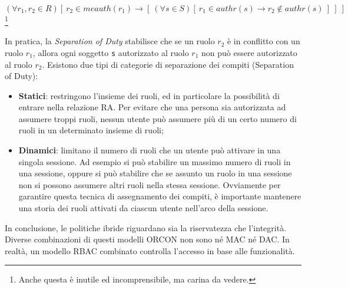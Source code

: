 \[
      (\forall r_1, r_2 \in R) [ \ r_2 \in meauth(r_1) \rightarrow
                  [ \ (\forall s \in S) [ \ r_1 \in authr(s) \rightarrow r_2 \notin authr(s) \ ] \ ] \ ]
\] \footnote{Anche questa è inutile ed incomprensibile, ma carina da vedere.}

In pratica, la \textit{Separation of Duty} stabilisce che
se un ruolo \(r_2\) è in conflitto con un ruolo \(r_1\),
allora ogni soggetto \verb|s| autorizzato al ruolo \(r_1\)
non può essere autorizzato al ruolo \(r_2\).
Esistono due tipi di categorie di separazione dei compiti (Separation of Duty):

\begin{itemize}
      \item \textbf{Statici}: restringono l'insieme dei ruoli, ed in particolare
            la possibilità di entrare nella
            relazione RA. Per evitare che una persona sia autorizzata ad assumere
            troppi ruoli, nessun
            utente può assumere più di un certo numero di ruoli in un determinato
            insieme di ruoli;
      \item \textbf{Dinamici}: limitano il numero di ruoli che un utente può
            attivare in una singola sessione.
            Ad esempio si può stabilire un massimo numero di ruoli in una sessione,
            oppure si può stabilire che se assunto un ruolo in una sessione non
            si possono assumere altri ruoli nella stessa
            sessione. Ovviamente per garantire questa tecnica di assegnamento
            dei compiti, è
            importante mantenere una storia dei ruoli attivati da ciascun
            utente nell'arco della sessione.
\end{itemize}

In conclusione, le politiche ibride riguardano sia la riservatezza che l'integrità.
Diverse combinazioni di questi modelli ORCON non sono né MAC né DAC.
In realtà, un modello RBAC combinato controlla l'accesso in base alle funzionalità.